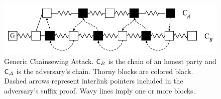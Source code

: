 \begin{figure}
	\begin{center}
		\includegraphics[width=0.9\columnwidth
		]{figures/generic_chainsewing_attack.pdf}
	\end{center}
	\caption{Generic Chainsewing Attack. $\mathsf{C}_B$ is the chain of an honest party and $\mathsf{C}_\mathcal{A}$ is the adversary's chain. Thorny blocks are colored black. Dashed arrows represent interlink pointers included in the	adversary's suffix proof. Wavy lines imply one or more blocks.}
	\label{fig:generic_attack}
\end{figure}

